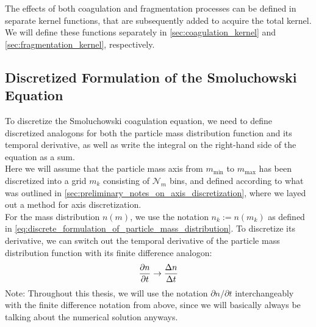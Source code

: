     The effects of both coagulation and fragmentation processes can be defined in separate 
    kernel functions, that are subsequently added to acquire the total kernel. We will define 
    these functions separately in \cref{sec:coagulation_kernel} and \cref{sec:fragmentation_kernel},
    respectively.




 

    \newpage\subsection{Discretized Formulation of the Smoluchowski Equation}

        To discretize the Smoluchowski coagulation equation, we need to define discretized 
        analogons for both the particle mass distribution function and its temporal derivative, 
        as well as write the integral on the right-hand side of the equation as a sum. \\

        Here we will assume that the particle mass axis from $m_\text{min}$ to $m_\text{max}$ 
        has been discretized into a grid $m_k$ consisting of $\mathcal N_m$ bins, and defined 
        according to what was outlined in \cref{sec:preliminary_notes_on_axis_discretization}, 
        where we layed out a method for axis discretization. \\

        For the mass distribution $n(m)$, we use the notation $n_k := n(m_k)$ as defined in
        \cref{eq:discrete_formulation_of_particle_mass_distribution}.
        To discretize its derivative, we can switch out the temporal derivative 
        of the particle mass distribution function with its finite difference analogon:
        \begin{equation}
            \frac{\partial n}{\partial t} \to \frac{\Delta n}{\Delta t}
        \end{equation}
        Note: Throughout this thesis, we will use the notation $\partial n/\partial t$ 
        interchangeably with the finite difference notation from above, since we will basically 
        always be talking about the numerical solution anyways. \\

